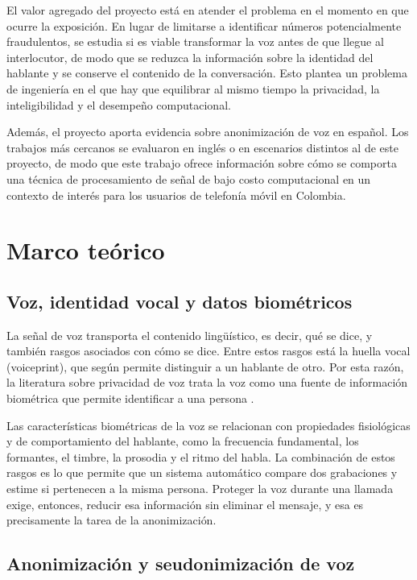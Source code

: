 \documentclass[10pt,twocolumn]{article}
\newcommand{\textcite}[1]{\citet{#1}}
\newcommand{\parencite}[1]{\citep{#1}}
\begin{document}
El valor agregado del proyecto está en atender el problema en el momento en que ocurre la exposición. En lugar de limitarse a identificar números potencialmente fraudulentos, se estudia si es viable transformar la voz antes de que llegue al interlocutor, de modo que se reduzca la información sobre la identidad del hablante y se conserve el contenido de la conversación. Esto plantea un problema de ingeniería en el que hay que equilibrar al mismo tiempo la privacidad, la inteligibilidad y el desempeño computacional.

Además, el proyecto aporta evidencia sobre anonimización de voz en español. Los trabajos más cercanos se evaluaron en inglés o en escenarios distintos al de este proyecto, de modo que este trabajo ofrece información sobre cómo se comporta una técnica de procesamiento de señal de bajo costo computacional en un contexto de interés para los usuarios de telefonía móvil en Colombia.

\section{Marco teórico}\label{sec:2}

\subsection{Voz, identidad vocal y datos biométricos}\label{sec:2.1}

La señal de voz transporta el contenido lingüístico, es decir, qué se dice, y también rasgos asociados con cómo se dice. Entre estos rasgos está la huella vocal (voiceprint), que según \textcite{deng2023} permite distinguir a un hablante de otro. Por esta razón, la literatura sobre privacidad de voz trata la voz como una fuente de información biométrica que permite identificar a una persona \parencite{patino2021}.

Las características biométricas de la voz se relacionan con propiedades fisiológicas y de comportamiento del hablante, como la frecuencia fundamental, los formantes, el timbre, la prosodia y el ritmo del habla. La combinación de estos rasgos es lo que permite que un sistema automático compare dos grabaciones y estime si pertenecen a la misma persona. Proteger la voz durante una llamada exige, entonces, reducir esa información sin eliminar el mensaje, y esa es precisamente la tarea de la anonimización.

\subsection{Anonimización y seudonimización de voz}\label{sec:2.2}
\end{document}
